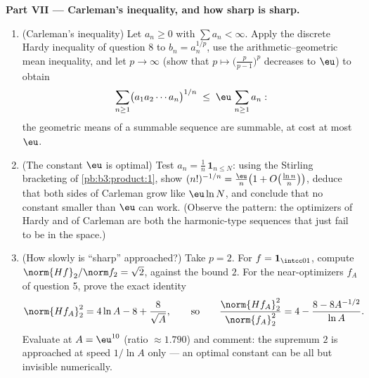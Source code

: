 \begin{problem}
\medskip
\noindent\textbf{Part VII --- Carleman's inequality, and how
sharp is sharp.}
\begin{enumerate}[resume]
  \item (Carleman's inequality) Let $a_n \geq 0$ with $\sum
        a_n < \infty$. Apply the discrete Hardy inequality of
        question 8 to $b_n = a_n^{1/p}$, use the
        arithmetic--geometric mean inequality, and let $p \to
        \infty$ (show that $p \mapsto
        \bigl(\frac p{p-1}\bigr)^p$ decreases to $\eu$) to
        obtain
        \[
        \sum_{n\geq1}\bigl(a_1a_2\cdots a_n\bigr)^{1/n}
        \;\leq\; \eu\,\sum_{n\geq1}a_n :
        \]
        the geometric means of a summable sequence are
        summable, at cost at most $\eu$.
  \item (The constant $\eu$ is optimal) Test $a_n =
        \frac1n\,\mathbf 1_{n\leq N}$: using the Stirling
        bracketing of \cref{pb:b3:product:1}, show
        $(n!)^{-1/n} = \frac\eu n\bigl(1 +
        O\bigl(\frac{\ln n}n\bigr)\bigr)$, deduce that both
        sides of Carleman grow like $\eu\ln N$, and conclude
        that no constant smaller than $\eu$ can work. (Observe
        the pattern: the optimizers of Hardy and of Carleman
        are both the harmonic-type sequences that just fail to
        be in the space.)
  \item (How slowly is ``sharp'' approached?) Take $p = 2$.
        For $f = \mathbf 1_{\intcc01}$, compute
        $\norm{Hf}_2/\norm f_2 = \sqrt2$, against the bound
        $2$. For the near-optimizers $f_A$ of question 5,
        prove the exact identity
        \[
        \norm{Hf_A}_2^2 = 4\ln A - 8 + \frac{8}{\sqrt A},
        \qquad\text{so}\qquad
        \frac{\norm{Hf_A}_2^2}{\norm{f_A}_2^2}
        = 4 - \frac{8 - 8A^{-1/2}}{\ln A} .
        \]
        Evaluate at $A = \eu^{10}$ (ratio $\approx 1.790$)
        and comment: the supremum $2$ is approached at speed
        $1/\ln A$ only --- an optimal constant can be all but
        invisible numerically.
\end{enumerate}
\end{problem}
